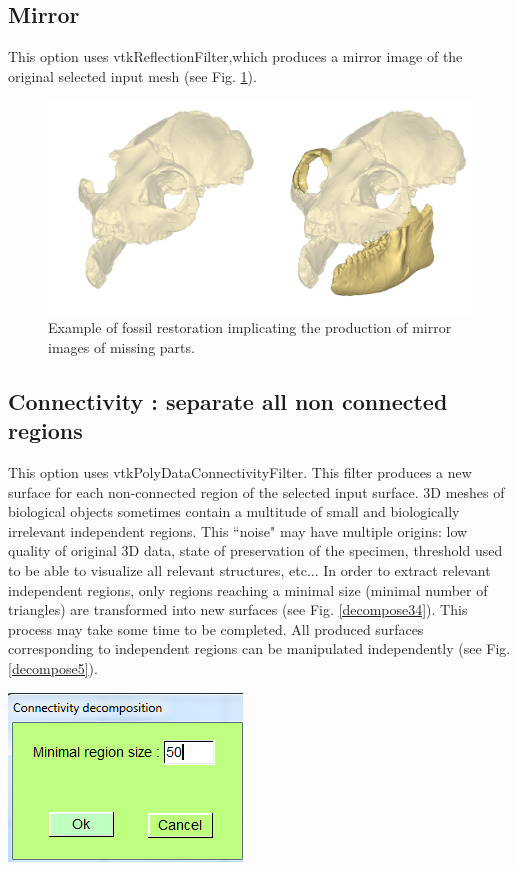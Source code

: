 \subsection{Mirror}

This option uses vtkReflectionFilter,which produces a mirror image of the original selected input mesh (see Fig. \ref{mirror}).\\

\begin{figure}
  \centering
  \includegraphics[scale=0.35]{images/Edit_selected_objects/02_Mirror.png} 
	\caption{Example of fossil restoration implicating the production of mirror images of missing parts.}
 \label{mirror}
\end{figure}

\subsection{Connectivity : separate all non connected regions}
\noindent
\begin{minipage}{0.5\textwidth}
This option uses vtkPolyDataConnectivityFilter. This filter produces a new surface for each non-connected region of the selected input surface. 3D meshes of biological objects sometimes contain a multitude of small and biologically irrelevant independent regions. This ``noise" may have multiple origins: low quality of original 3D data, state of preservation of the specimen, threshold used to be able to visualize all relevant structures, etc... In order to extract relevant independent regions, only regions reaching a minimal size (minimal number of triangles) are transformed into new surfaces (see Fig. \ref{decompose34}). This process may take some time to be completed. All produced surfaces corresponding to independent regions can be manipulated independently (see Fig. \ref{decompose5}).\end{minipage}    
\begin{minipage}{0.5\textwidth}\centering
  \includegraphics[scale=0.5]{images/Edit_selected_objects/03_Decompose.png}
 \end{minipage} 
\noindent


